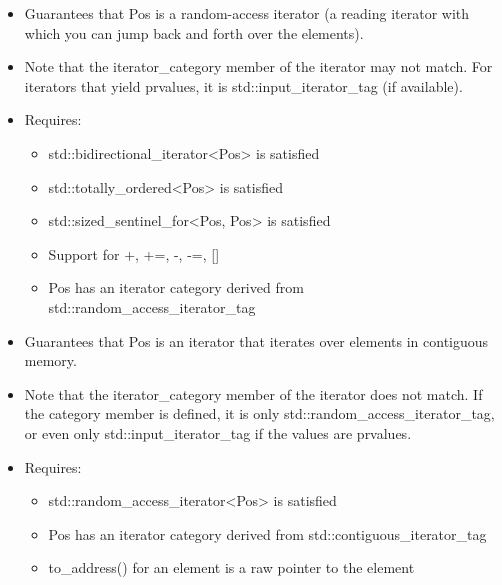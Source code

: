 \begin{itemize}
\item
Guarantees that Pos is a random-access iterator (a reading iterator with which you can jump back and forth over the elements).

\item
Note that the iterator\_category member of the iterator may not match. For iterators that yield prvalues, it is std::input\_iterator\_tag (if available).

\item
Requires:
\begin{itemize}
\item
std::bidirectional\_iterator<Pos> is satisfied

\item
std::totally\_ordered<Pos> is satisfied

\item
std::sized\_sentinel\_for<Pos, Pos> is satisfied

\item
Support for +, +=, -, -=, []

\item
Pos has an iterator category derived from std::random\_access\_iterator\_tag
\end{itemize}
\end{itemize}


\begin{itemize}
\item
Guarantees that Pos is an iterator that iterates over elements in contiguous memory.

\item
Note that the iterator\_category member of the iterator does not match. If the category member is defined, it is only std::random\_access\_iterator\_tag, or even only std::input\_iterator\_tag if the values are prvalues.

\item
Requires:
\begin{itemize}
\item
std::random\_access\_iterator<Pos> is satisfied

\item
Pos has an iterator category derived from std::contiguous\_iterator\_tag

\item
to\_address() for an element is a raw pointer to the element
\end{itemize}
\end{itemize}

